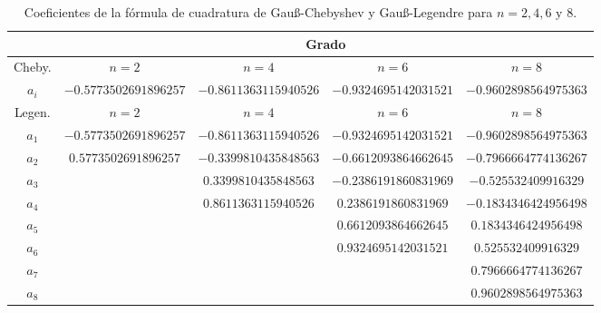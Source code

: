 \documentclass[a4paper]{article}
\begin{document}
\begin{table}[ht]
    \centering
    \begin{tabular}{|c|c|c|c|c|}
        \cline{2-5}
        \multicolumn{1}{c}{} & \multicolumn{4}{|c|}{Grado}\\
        \hline
        Cheby. & $n=2$ & $n=4$ & $n=6$ & $n=8$ \\
        \hline
        $a_i$ & $-0.5773502691896257$ & $-0.8611363115940526$ & $-0.9324695142031521$ & $-0.9602898564975363$ \\
        \hline
        \hline
        Legen. & $n=2$ & $n=4$ & $n=6$ & $n=8$ \\
        \hline
        $a_1$ & $-0.5773502691896257$ & $-0.8611363115940526$ & $-0.9324695142031521$ & $-0.9602898564975363$ \\
        $a_2$ & $0.5773502691896257$ & $-0.3399810435848563$ & $-0.6612093864662645$ & $-0.7966664774136267$ \\
        $a_3$ & & $0.3399810435848563$ & $-0.2386191860831969$ & $-0.525532409916329$ \\
        $a_4$ & & $0.8611363115940526$ & $0.2386191860831969$ & $-0.1834346424956498$ \\
        $a_5$ & & & $0.6612093864662645$ & $0.1834346424956498$ \\
        $a_6$ & & & $0.9324695142031521$ & $0.525532409916329$ \\
        $a_7$ & & & & $0.7966664774136267$ \\
        $a_8$ & & & & $0.9602898564975363$ \\
        \hline
    \end{tabular}
    \caption{Coeficientes de la fórmula de cuadratura de Gau\ss-Chebyshev y Gau\ss-Legendre para $n=2,4,6\text{ y }8$.}
\end{table}
\end{document}
